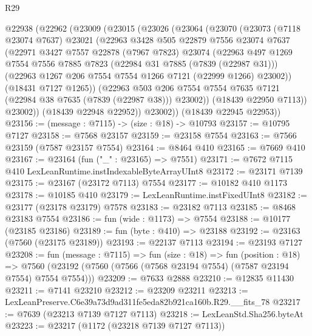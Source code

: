 \begin{lexlean}{R29}
\begin{coremodule}
  @22938
    (@22962
      (@23009
        (@23015
          (@23026
            (@23064
              (@23070
                (@23073
                  (@7118 @23074 @7637)
                  @23021
                  (@22963
                    @3428
                    @505
                    @22879
                    @7556
                    @23074
                    @7637
                    (@22971
                      @3427
                      @7557
                      @22878
                      (@7967 @7823)
                      @23074
                      (@22963
                        @497
                        @1269
                        @7554
                        @7556
                        @7885
                        @7823
                        (@22984 @31 @7885 (@7839 (@22987 @31)))
                        (@22963 @1267 @206 @7554 @7554 @1266 @7121 (@22999 @1266) @23002))
                      (@18431 @7127 @1265))
                    (@22963
                      @503
                      @206
                      @7554
                      @7554
                      @7635
                      @7121
                      (@22984 @38 @7635 (@7839 (@22987 @38)))
                      @23002))
                  (@18439 @22950 @7113))
                @23002))
            (@18439 @22948 @22952))
          @23002))
      (@18439 @22945 @22953))
@23156 := (message : @7115) -> (size : @18) -> @10793
@23157 := @10795 @7127
@23158 := @7568 @23157
@23159 := @23158 @7554
@23163 := @7566 @23159 (@7587 @23157 @7554)
@23164 := @8464 @410
@23165 := @7669 @410
@23167 := @23164 (fun ("_" : @23165) => @7551)
@23171 := @7672 @7115 @410 LexLeanRuntime.instIndexableByteArrayUInt8
@23172 := @23171 @7139
@23175 := @23167 (@23172 @7113) @7554
@23177 := @10182 @410 @1173
@23178 := @10185 @410
@23179 := LexLeanRuntime.instFixedUInt8
@23182 := @23177 (@23178 @23179) @7578
@23183 := @23182 @7113
@23185 := @8468 @23183 @7554
@23186 := fun (wide : @1173) => @7554
@23188 := @10177 (@23185 @23186)
@23189 := fun (byte : @410) => @23188
@23192 := @23163 (@7560 (@23175 @23189))
@23193 := @22137 @7113
@23194 := @23193 @7127
@23208 := fun (message : @7115) =>
  fun (size : @18) =>
  fun (position : @18) =>
  @7560 (@23192 (@7560 (@7566 (@7568 @23194 @7554) (@7587 @23194 @7554) @7554 @7554)))
@23209 := @7633 @2888
@23210 := @12835 @11430
@23211 := @7141 @23210
@23212 := @23209 @23211
@23213 := LexLeanPreserve.C6e39a73d9ad311fe5eda82b921ca160b.R29.__fits_78
@23217 := @7639 (@23213 @7139 @7127 @7113)
@23218 := LexLeanStd.Sha256.byteAt
@23223 := @23217 (@1172 (@23218 @7139 @7127 @7113))

\end{coremodule}
\end{lexlean}
